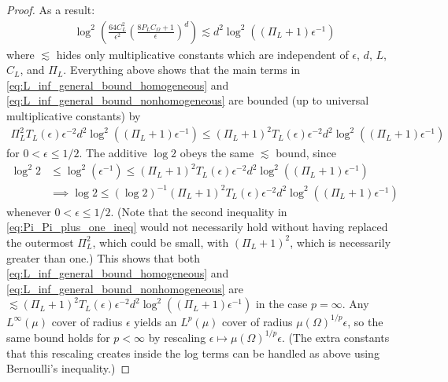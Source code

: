 \documentclass{article}
\begin{document}
\begin{appendices}
\begin{proof}
    As a result:
    \begin{align}  \label{eq:log_sq_homogeneous_lesssim_bound}
        \log^2 \left( \frac{64 C_L^2}{\epsilon^2} \left( \frac{8 P_L C_{\Omega} + 1}{\epsilon} \right)^d \right)  \lesssim d^2 \log^2 \left( (\Pi_L + 1) \epsilon^{-1} \right)
    \end{align}
    where $\lesssim$ hides only multiplicative constants which are independent of $\epsilon$, $d$, $L$, $C_L$, and $\Pi_L$. Everything above shows that the main terms in \eqref{eq:L_inf_general_bound_homogeneous} and \eqref{eq:L_inf_general_bound_nonhomogeneous} are bounded (up to universal multiplicative constants) by
    \begin{align}
        \Pi_L^2 T_L(\epsilon) \epsilon^{-2} d^2 \log^2 \left((\Pi_L+1) \epsilon^{-1} \right) \leq (\Pi_L+1)^2 T_L(\epsilon) \epsilon^{-2} d^2 \log^2 \left((\Pi_L+1) \epsilon^{-1} \right) 
    \end{align}
    for $0 < \epsilon \leq 1/2$. The additive $\log 2$ obeys the same $\lesssim$ bound, since
    \begin{align}
        \log^2 2 &\leq \log^2 (\epsilon^{-1}) \leq (\Pi_L+1)^2 T_L(\epsilon) \epsilon^{-2} d^2 \log^2 \left((\Pi_L+1) \epsilon^{-1} \right) \label{eq:Pi_Pi_plus_one_ineq} \\
        &\implies \log 2 \leq (\log 2)^{-1} (\Pi_L+1)^2 T_L(\epsilon) \epsilon^{-2} d^2 \log^2 \left((\Pi_L+1) \epsilon^{-1} \right)
    \end{align}
    whenever $0 < \epsilon \leq 1/2$. (Note that the second inequality in \eqref{eq:Pi_Pi_plus_one_ineq} would not necessarily hold without having replaced the outermost $\Pi_L^2$, which could be small, with $(\Pi_L+1)^2$, which is necessarily greater than one.) This shows that both \eqref{eq:L_inf_general_bound_homogeneous} and \eqref{eq:L_inf_general_bound_nonhomogeneous} are $\lesssim (\Pi_L+1)^2 T_L(\epsilon) \epsilon^{-2} d^2 \log^2 \left((\Pi_L + 1) \epsilon^{-1} \right)$ in the case $p = \infty$. Any $L^\infty(\mu)$ cover of radius $\epsilon$ yields an $L^p(\mu)$ cover of radius $\mu(\Omega)^{1/p} \epsilon$, so the same bound holds for $p < \infty$ by rescaling $\epsilon \mapsto \mu(\Omega)^{1/p} \epsilon$. (The extra constants that this rescaling creates inside the log terms can be handled as above using Bernoulli's inequality.) 

    

\end{proof}
\end{appendices}
\end{document}
